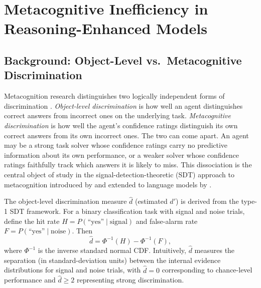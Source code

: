 %

\section{Metacognitive Inefficiency in Reasoning-Enhanced Models}
\label{sec:metacognitive-inefficiency}

\subsection{Background: Object-Level vs.\ Metacognitive Discrimination}
\label{sec:background-sdt}

Metacognition research distinguishes two logically independent forms of discrimination \citep{maniscalco2012, fleming2014}. \emph{Object-level discrimination} is how well an agent distinguishes correct answers from incorrect ones on the underlying task. \emph{Metacognitive discrimination} is how well the agent's confidence ratings distinguish its own correct answers from its own incorrect ones. The two can come apart. An agent may be a strong task solver whose confidence ratings carry no predictive information about its own performance, or a weaker solver whose confidence ratings faithfully track which answers it is likely to miss. This dissociation is the central object of study in the signal-detection-theoretic (SDT) approach to metacognition introduced by \citet{maniscalco2012} and extended to language models by \citet{wang2025metasdt}.

The object-level discrimination measure $\hat{d}$ (estimated $d'$) is derived from the type-1 SDT framework. For a binary classification task with signal and noise trials, define the hit rate $H = P(\text{``yes''} \mid \text{signal})$ and false-alarm rate $F = P(\text{``yes''} \mid \text{noise})$. Then
\begin{equation}
\hat{d} = \Phi^{-1}(H) - \Phi^{-1}(F),
\end{equation}
where $\Phi^{-1}$ is the inverse standard normal CDF. Intuitively, $\hat{d}$ measures the separation (in standard-deviation units) between the internal evidence distributions for signal and noise trials, with $\hat{d} = 0$ corresponding to chance-level performance and $\hat{d} \geq 2$ representing strong discrimination.

